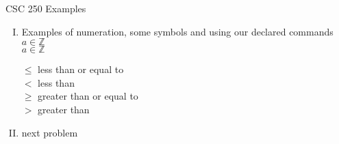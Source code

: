 \documentclass[12pt]{article}
\newcommand{\ZZ}{\mathbb{Z}}
\begin{document}
\begin{center}
CSC 250 \qquad Examples
\end{center}

\begin{enumerate}[I.)]
\item Examples of numeration, some symbols and using our declared commands\\
$a\in \mathbb{Z}$\\
$a\in\ZZ$

$\leq$ less than or equal to\\
$<$ less than\\
$\geq$ greater than or equal to\\
$>$ greater than

\item next problem

\end{enumerate}
\end{document}
